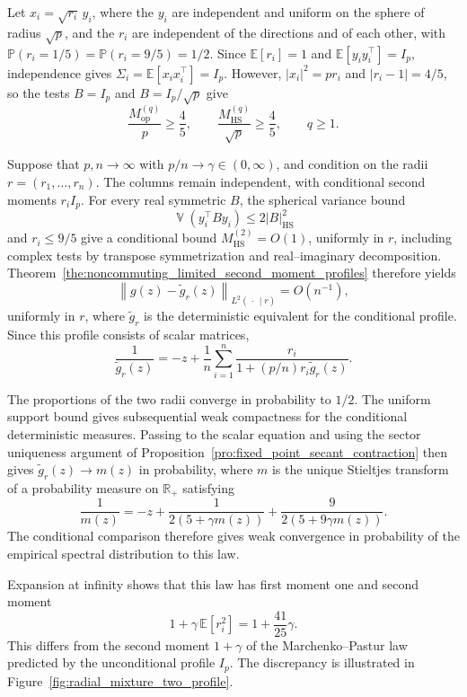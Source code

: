 \documentclass[EJP, preprint, NODS, nobera, nofontexpansion]{ejpecp}
\DeclareMathOperator{\op}{op}
\DeclareMathOperator{\hs}{HS}
\DeclareMathOperator{\Var}{\mathbb V}
\begin{document}
\begin{example}
\label{exa:isotropic_radial_mixture}
Let $x_i=\sqrt{r_i}\,y_i$, where the $y_i$ are independent and uniform
on the sphere of radius $\sqrt p$, and the $r_i$ are independent of
the directions and of each other, with
$\mathbb P(r_i=1/5)=\mathbb P(r_i=9/5)=1/2$.
Since $\mathbb E[r_i]=1$ and $\mathbb E[y_i y_i^\top]=I_p$,
independence gives $\Sigma_i=\mathbb E[x_i x_i^\top]=I_p$.
However, $|x_i|^2=pr_i$ and $|r_i-1|=4/5$, so the tests
$B=I_p$ and $B=I_p/\sqrt p$ give
\[
    \frac{M_{\op}^{(q)}}p\geq\frac45,
    \qquad
    \frac{M_{\hs}^{(q)}}{\sqrt p}\geq\frac45,
    \qquad q\geq1.
\]

Suppose that $p,n\to\infty$ with $p/n\to\gamma\in(0,\infty)$,
and condition on the radii $ r=(r_1,\ldots,r_n)$.
The columns remain independent, with conditional second moments
$r_iI_p$. For every real symmetric $B$, the spherical variance bound
\[
    \Var(y_i^\top By_i)\leq2|B|_{\hs}^2
\]
and $r_i\leq9/5$ give a conditional bound $M_{\hs}^{(2)}=O(1)$,
uniformly in $ r$, including complex tests by
transpose symmetrization and real--imaginary decomposition.
Theorem~\ref{the:noncommuting_limited_second_moment_profiles}
therefore yields
\[
    \left\|g(z)-\tilde g_{ r}(z)\right\|_{
        L^2(\,\cdot\,\mid r)}
    =O(n^{-1}),
\]
uniformly in $ r$, where $\tilde g_{ r}$ is the
deterministic equivalent for the conditional profile. Since this
profile consists of scalar matrices,
\[
    \frac1{\tilde g_{ r}(z)}
    =-z+\frac1n\sum_{i=1}^n
    \frac{r_i}{1+(p/n)r_i\tilde g_{ r}(z)}.
\]

The proportions of the two radii converge in probability to $1/2$.
The uniform support bound gives subsequential weak compactness for
the conditional deterministic measures. Passing to the scalar equation
and using the sector uniqueness argument of
Proposition~\ref{pro:fixed_point_secant_contraction} then gives
$\tilde g_{ r}(z)\to m(z)$ in probability, where $m$ is
the unique Stieltjes transform of a probability measure on
$\mathbb R_+$ satisfying
\[
    \frac1{m(z)}
    =-z+\frac1{2(5+\gamma m(z))}
       +\frac9{2(5+9\gamma m(z))}.
\]
The conditional comparison therefore gives weak convergence in
probability of the empirical spectral distribution to this law.

Expansion at infinity shows that this law has first moment one and second moment
\[
    1+\gamma\,\mathbb E[r_i^2]
    =1+\frac{41}{25}\gamma.
\]
This differs from the second moment $1+\gamma$ of the Marchenko--Pastur
law predicted by the unconditional profile $I_p$.
The discrepancy is illustrated in
Figure~\ref{fig:radial_mixture_two_profile}.
\end{example}
\end{document}
